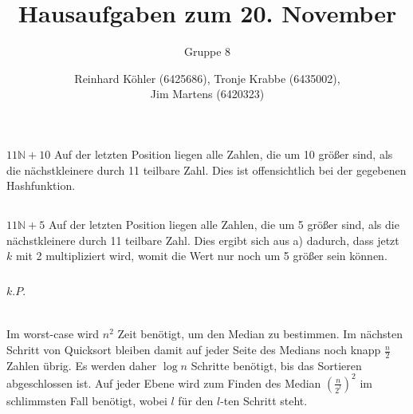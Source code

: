 \documentclass[10pt,a4paper,oneside,ngerman,numbers=noenddot]{scrartcl}
\begin{document}
\author{Reinhard Köhler (6425686), Tronje Krabbe (6435002), \\
Jim Martens (6420323)}
\title{Hausaufgaben zum 20. November}
\subtitle{Gruppe 8}
\maketitle
\section{} %
	\subsection{} %
		$11\mathbb{N}+10$
		Auf der letzten Position liegen alle Zahlen, die um 10 größer sind, als die nächstkleinere durch 11 teilbare Zahl. Dies ist offensichtlich bei der gegebenen Hashfunktion. 
	\subsection{} %
		$11\mathbb{N}+5$
		Auf der letzten Position liegen alle Zahlen, die um 5 größer sind, als die nächstkleinere durch 11 teilbare Zahl. Dies ergibt sich aus a) dadurch, dass jetzt $k$ mit 2 multipliziert wird, womit die Wert nur noch um 5 größer sein können.
	\subsection{} %
		$k.P.$
	\subsection{} %
\section{} %
	
\section{} %
	\subsection{} %
		Im worst-case wird $n^{2}$ Zeit benötigt, um den Median zu bestimmen. Im nächsten Schritt von Quicksort bleiben damit auf jeder Seite des Medians noch knapp $\frac{n}{2}$ Zahlen übrig.
		Es werden daher $\log n$ Schritte benötigt, bis das Sortieren abgeschlossen ist. Auf jeder Ebene wird zum Finden des Median $\left(\frac{n}{2^{l}}\right)^{2}$ im schlimmsten Fall benötigt, wobei $l$ für den $l$-ten Schritt steht.
		
\end{document}
